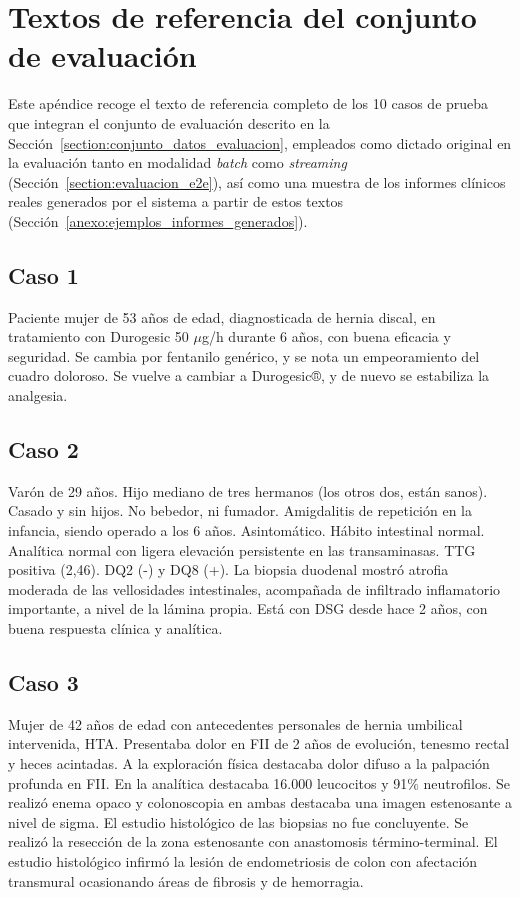 \chapter{Textos de referencia del conjunto de evaluación}\label{anexo:textos_evaluacion}

Este apéndice recoge el texto de referencia completo de los 10 casos de prueba que integran el
conjunto de evaluación descrito en la Sección~\ref{section:conjunto_datos_evaluacion}, empleados
como dictado original en la evaluación  tanto en modalidad \textit{batch}
como \textit{streaming} (Sección~\ref{section:evaluacion_e2e}), así como una muestra de los
informes clínicos reales generados por el sistema a partir de estos textos
(Sección~\ref{anexo:ejemplos_informes_generados}).

\section{Caso 1}\label{anexo:texto_caso_1}

Paciente mujer de 53 años de edad, diagnosticada de hernia discal, en tratamiento con Durogesic
50 $\mu$g/h durante 6 años, con buena eficacia y seguridad. Se cambia por fentanilo genérico, y se nota
un empeoramiento del cuadro doloroso. Se vuelve a cambiar a Durogesic®, y de nuevo se estabiliza la
analgesia.

\section{Caso 2}\label{anexo:texto_caso_2}

Varón de 29 años. Hijo mediano de tres hermanos (los otros dos, están sanos). Casado y sin hijos.
No bebedor, ni fumador. Amigdalitis de repetición en la infancia, siendo operado a los 6 años.
Asintomático. Hábito intestinal normal. Analítica normal con ligera elevación persistente en las
transaminasas. TTG positiva (2,46). DQ2 (-) y DQ8 (+). La biopsia duodenal mostró atrofia moderada
de las vellosidades intestinales, acompañada de infiltrado inflamatorio importante, a nivel de la
lámina propia. Está con DSG desde hace 2 años, con buena respuesta clínica y analítica.

\section{Caso 3}\label{anexo:texto_caso_3}

Mujer de 42 años de edad con antecedentes personales de hernia umbilical intervenida, HTA.
Presentaba dolor en FII de 2 años de evolución, tenesmo rectal y heces acintadas. A la exploración
física destacaba dolor difuso a la palpación profunda en FII. En la analítica destacaba 16.000
leucocitos y 91\% neutrofilos. Se realizó enema opaco y colonoscopia en ambas destacaba una imagen
estenosante a nivel de sigma. El estudio histológico de las biopsias no fue concluyente. Se realizó
la resección de la zona estenosante con anastomosis término-terminal. El estudio histológico
infirmó la lesión de endometriosis de colon con afectación transmural ocasionando áreas de fibrosis
y de hemorragia.

